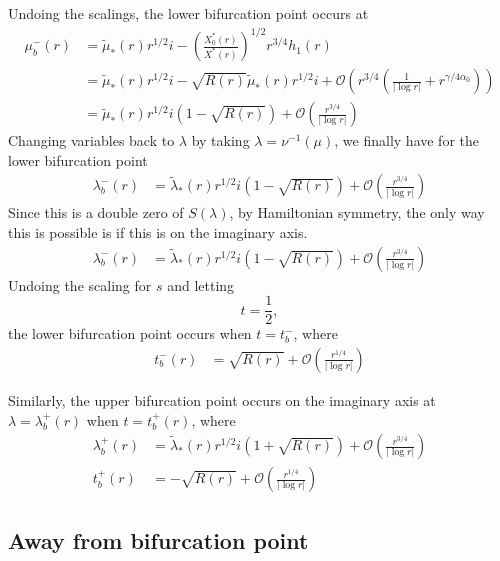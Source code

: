 \documentclass[thesis.tex]{subfiles}
\begin{document}
Undoing the scalings, the lower bifurcation point occurs at
\begin{align*}
\mu_b^-(r) &= \tilde{\mu}_*(r) r^{1/2} i - \left(\frac{X_0^*(r)}{X^*(r) }\right)^{1/2} r^{3/4} h_1(r) \\
&= \tilde{\mu}_*(r) r^{1/2} i - \sqrt{R(r)} \tilde{\mu}_*(r) r^{1/2}i + \mathcal{O}\left( r^{3/4} \left( \frac{1}{|\log r|} + r^{\gamma/4\alpha_0} \right) \right) \\
&= \tilde{\mu}_*(r) r^{1/2} i \left( 1 - \sqrt{R(r)}\right) + \mathcal{O}\left( \frac{r^{3/4}}{|\log r|} \right) 
\end{align*}
Changing variables back to $\lambda$ by taking $\lambda = \nu^{-1}(\mu)$, we finally have for the lower bifurcation point 
\begin{align*}
\lambda_b^-(r) &= \tilde{\lambda}_*(r) r^{1/2} i \left( 1 - \sqrt{R(r)}\right) + \mathcal{O}\left( \frac{r^{3/4}}{|\log r|} \right) 
\end{align*}
Since this is a double zero of $S(\lambda)$, by Hamiltonian symmetry, the only way this is possible is if this is on the imaginary axis.
\begin{align*}
\lambda_b^-(r) &= \tilde{\lambda}_*(r) r^{1/2} i \left( 1 - \sqrt{R(r)}\right) + \mathcal{O}\left( \frac{r^{3/4}}{|\log r|} \right) 
\end{align*}
Undoing the scaling for $s$ and letting 
\[
t = \frac{1}{2},
\] 
the lower bifurcation point occurs when $t = t_b^-$, where
\begin{align*}
t_b^-(r) &= \sqrt{R(r)} + \mathcal{O}\left( \frac{r^{1/4}}{|\log r|} \right)
\end{align*}

Similarly, the upper bifurcation point occurs on the imaginary axis at $\lambda = \lambda_b^+(r)$ when $t = t_b^+(r)$, where
\begin{align*}
\lambda_b^+(r) &= \tilde{\lambda}_*(r) r^{1/2} i \left( 1 + \sqrt{R(r)}\right) + \mathcal{O}\left( \frac{r^{3/4}}{|\log r|} \right) \\
t_b^+(r) &= -\sqrt{R(r)} + \mathcal{O}\left( \frac{r^{1/4}}{|\log r|} \right)
\end{align*}

\subsection{Away from bifurcation point}
\end{document}
